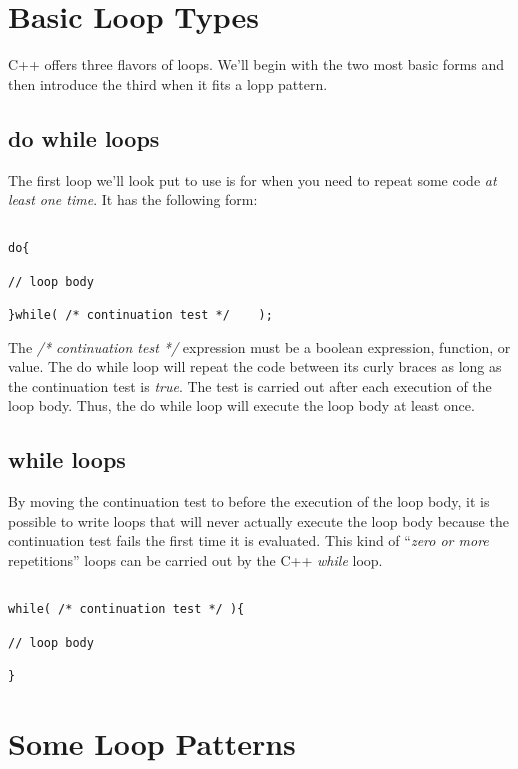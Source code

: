 \documentclass[]{tufte-handout}
\begin{document}
\section{Basic Loop Types}

C++ offers three flavors of loops.  We'll begin with the two most basic forms and then introduce the third when it fits a lopp pattern. 

\subsection{do while loops}

The first loop we'll look put to use is for when you need to repeat some code \textit{at least one time}.  It has the following form:
\begin{verbatim}

do{
 
// loop body

}while( /* continuation test */    );

\end{verbatim}
The \textit{/* continuation test */} expression must be a boolean expression, function, or value.  The do while loop will repeat the code between its curly braces as long as the continuation test is \textit{true}. The test is carried out after each execution of the loop body.  Thus, the do while loop will execute the loop body at least once. 

\subsection{while loops}

By moving the continuation test to before the execution of the loop body, it is possible to write loops that will never actually execute the loop body because the continuation test fails the first time it is evaluated.  This kind of ``\textit{zero or more} repetitions'' loops can be carried out by the C++ \textit{while} loop.
\begin{verbatim}

while( /* continuation test */ ){

// loop body

}

\end{verbatim}

\section{Some Loop Patterns}
\end{document}
